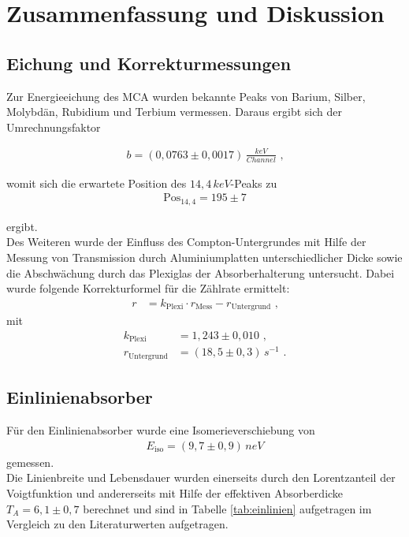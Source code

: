\section{Zusammenfassung und Diskussion \label{Diskussion}}
	
\subsection{Eichung und Korrekturmessungen}

Zur Energieeichung des MCA wurden bekannte Peaks von Barium, Silber, Molybdän, Rubidium und Terbium vermessen. Daraus ergibt sich der Umrechnungsfaktor 

\begin{align}	
	b=(0,0763\pm0,0017)\,\si{\frac{keV}{Channel}}\text{ ,}
\end{align}

womit sich die erwartete Position des $14,4\,\si{keV}$-Peaks zu 
\begin{align}
	\text{Pos}_{14,4}=195\pm7
\end{align}

ergibt.\\

Des Weiteren wurde der Einfluss des Compton-Untergrundes mit Hilfe der Messung von Transmission durch Aluminiumplatten unterschiedlicher Dicke sowie die Abschwächung durch das Plexiglas der Absorberhalterung untersucht. Dabei wurde folgende Korrekturformel für die Zählrate ermittelt:
\begin{align}
	r&=k_\mathrm{Plexi}\cdot r_\mathrm{Mess}-r_\mathrm{Untergrund}\text{ ,}
\end{align}
mit
\begin{align}
	k_\mathrm{Plexi}&=1,243\pm0,010\text{ ,}\\
	r_\mathrm{Untergrund}&=(18,5\pm0,3)\,\si{s^{-1}}\text{ .}
\end{align}

\subsection{Einlinienabsorber}
Für den Einlinienabsorber wurde eine Isomerieverschiebung von 
\begin{align}
	E_\mathrm{iso}=(9,7\pm0,9)\,\si{neV}
\end{align}
gemessen.\\

Die Linienbreite und Lebensdauer wurden einerseits durch den Lorentzanteil der Voigtfunktion und andererseits mit Hilfe der effektiven Absorberdicke $T_A=6,1\pm0,7$ berechnet und sind in Tabelle \ref{tab:einlinien} aufgetragen im Vergleich zu den Literaturwerten aufgetragen.\\

